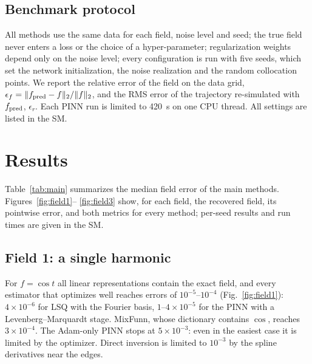 \documentclass[aps,pra,twocolumn,superscriptaddress,10pt,longbibliography,floatfix]{revtex4-2}
\newif\ifshowtodos \showtodostrue
\newcommand{\TODO}[1]{\ifshowtodos\textcolor{red}{\textbf{[TODO:} #1\textbf{]}}\fi}
\newcommand{\ef}{\epsilon_f}
\newcommand{\er}{\epsilon_r}
\begin{document}
\subsection{Benchmark protocol}\label{sec:protocol}
All methods use the same data for each field, noise level and seed; the true field never enters a loss
or the choice of a hyper-parameter; regularization weights depend only on the noise level; every
configuration is run with five seeds, which set the network initialization, the noise realization and
the random collocation points. We report the relative error of the field on the data grid,
$\ef=\|f_{\rm pred}-f\|_2/\|f\|_2$, and the RMS error of the trajectory re-simulated with $f_{\rm pred}$,
$\er$. Each PINN run is limited to 420~s on one CPU thread. All settings are listed in the SM.

\section{Results}\label{sec:results}

\begin{table}[t]
  \caption{Median relative field error $\ef$ over five seeds. LSQ: linear least squares. $^\dagger$Not yet
  available in the current protocol; value from an earlier protocol with a fixed collocation grid, 40
  B-splines and no edge constraint (see SM). \TODO{complete benchmark (180 of 440 runs missing)}}
  \label{tab:main}
  \centering
  
\end{table}

Table~\ref{tab:main} summarizes the median field error of the main methods. Figures~\ref{fig:field1}--%
\ref{fig:field3} show, for each field, the recovered field, its pointwise error, and both metrics for
every method; per-seed results and run times are given in the SM.

\subsection{Field 1: a single harmonic}\label{sec:field1}
For $f=\cos t$ all linear representations contain the exact field, and every estimator that optimizes
well reaches errors of $10^{-5}$--$10^{-4}$ (Fig.~\ref{fig:field1}): $4\times10^{-6}$ for LSQ with
the Fourier basis, $1$--$4\times10^{-5}$ for the PINN with a Levenberg--Marquardt stage. MixFunn, whose
dictionary contains $\cos$, reaches $3\times10^{-4}$. The Adam-only PINN stops at $5\times10^{-3}$:
even in the easiest case it is limited by the optimizer. Direct inversion is limited to $10^{-3}$ by the
spline derivatives near the edges.
\end{document}
